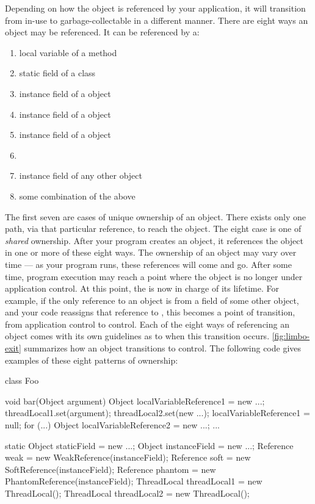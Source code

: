 Depending on how the object is referenced by your application, it will
transition from in-use to garbage-collectable in a different manner. There are
eight ways an object may be referenced. It can be referenced by a:

\begin{enumerate}
  \item local variable of a method
  \item static field of a class
  \item instance field of a  object
  \item instance field of a  object
  \item instance field of a  object
  \item \tls
  \item instance field of any other object
  \item some combination of the above
\end{enumerate}

The first seven are cases of unique ownership of an object. There exists
only one path, via that particular reference, to reach the object. The eight case
is one of \emph{shared} ownership. After your program creates an object, it
references the object in one or more of these eight ways. The ownership of an
object may vary over time --- as your program runs, these references will come
and go. After some time, program execution may reach a point where the object is
no longer under application control. At this point, the \jre is now in charge of
its lifetime. For example, if the only reference to an object is from a field of
some other object, and your code reassigns that reference to , this
becomes a point of transition, from application control to \jre control. Each of
the eight ways of referencing an object comes with its own guidelines as to when
this transition occurs. \autoref{fig:limbo-exit} %
summarizes how an object transitions to \jre control. The following code gives
examples of these eight patterns of ownership:
\lstset{numbers=left,numbersep=12pt,numberstyle=\tiny\textsf}
\begin{shortlisting}
class Foo {
   void bar(Object argument) {
      Object localVariableReference1 = new ...;
      threadLocal1.set(argument);
      threadLocal2.set(new ...);
      localVariableReference1 = null;
      for (...) {
         Object localVariableReference2 = new ...;
         ...
      }
   }

   static Object staticField = new ...;
   Object instanceField = new ...;
   Reference weak = new WeakReference(instanceField);
   Reference soft = new SoftReference(instanceField);
   Reference phantom = new PhantomReference(instanceField);
   ThreadLocal threadLocal1 = new ThreadLocal();
   ThreadLocal threadLocal2 = new ThreadLocal();
}
\end{shortlisting}
\lstset{numbers=none}

